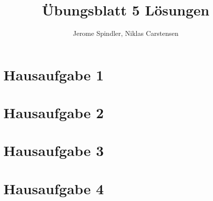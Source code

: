 \documentclass{article}
\title{Übungsblatt 5 Lösungen}
\author{Jerome Spindler, Niklas Carstensen}
\begin{document}
\maketitle

\section{Hausaufgabe 1}


\section{Hausaufgabe 2}


\section{Hausaufgabe 3}


\section{Hausaufgabe 4}

\end{document}
